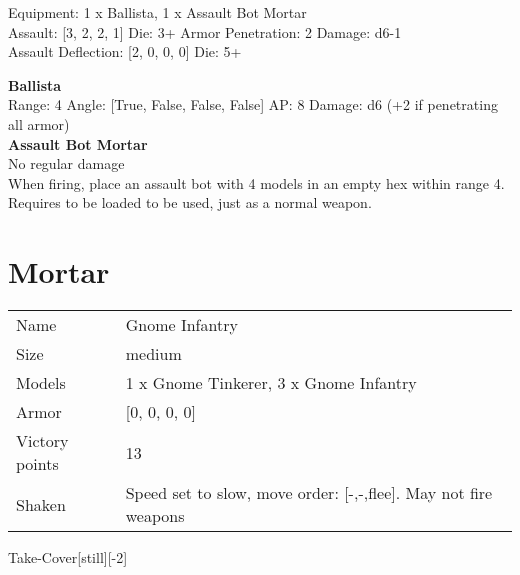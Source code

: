 Equipment: 1 x Ballista, 1 x Assault Bot Mortar \\

Assault: [3, 2, 2, 1] Die: 3+ Armor Penetration: 2 Damage: d6-1 \\
Assault Deflection: [2, 0, 0, 0] Die: 5+\\
\indent  



{\bf Ballista } \\



Range: 4  Angle: [True, False, False, False] AP: 8 Damage: d6 (+2 if penetrating all armor) \\




{\bf Assault Bot Mortar } \\

No regular damage\\ 
When firing, place an assault bot with 4 models in an empty hex within range 4. Requires to be loaded to be used, just as a normal weapon.\\ 





 















\clearpage

\section{ Mortar }

\begin{tabular}{ll}
  Name & Gnome Infantry \\
  Size & medium\\
  Models & 1 x Gnome Tinkerer, 3 x Gnome Infantry\\
  Armor & [0, 0, 0, 0]\\
  Victory points & 13\\
  Shaken & Speed set to slow, move order: [-,-,flee]. May not fire weapons\\
\end{tabular}

Take-Cover[still][-2]\\ 



